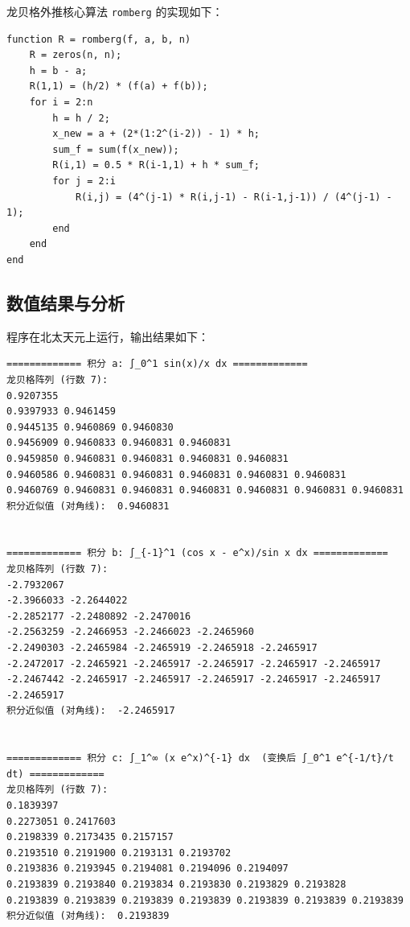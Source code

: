\documentclass[12pt,a4paper]{article}
\begin{document}
龙贝格外推核心算法 \texttt{romberg} 的实现如下：

\begin{lstlisting}[caption={龙贝格函数}, label={lst:romberg}]
function R = romberg(f, a, b, n)
    R = zeros(n, n);
    h = b - a;
    R(1,1) = (h/2) * (f(a) + f(b));
    for i = 2:n
        h = h / 2;
        x_new = a + (2*(1:2^(i-2)) - 1) * h;
        sum_f = sum(f(x_new));
        R(i,1) = 0.5 * R(i-1,1) + h * sum_f;
        for j = 2:i
            R(i,j) = (4^(j-1) * R(i,j-1) - R(i-1,j-1)) / (4^(j-1) - 1);
        end
    end
end
\end{lstlisting}

\subsection{数值结果与分析}

程序在北太天元上运行，输出结果如下：

\begin{verbatim}
============= 积分 a: ∫_0^1 sin(x)/x dx =============
龙贝格阵列 (行数 7):
0.9207355 
0.9397933 0.9461459 
0.9445135 0.9460869 0.9460830 
0.9456909 0.9460833 0.9460831 0.9460831 
0.9459850 0.9460831 0.9460831 0.9460831 0.9460831 
0.9460586 0.9460831 0.9460831 0.9460831 0.9460831 0.9460831 
0.9460769 0.9460831 0.9460831 0.9460831 0.9460831 0.9460831 0.9460831 
积分近似值 (对角线):  0.9460831


============= 积分 b: ∫_{-1}^1 (cos x - e^x)/sin x dx =============
龙贝格阵列 (行数 7):
-2.7932067 
-2.3966033 -2.2644022 
-2.2852177 -2.2480892 -2.2470016 
-2.2563259 -2.2466953 -2.2466023 -2.2465960 
-2.2490303 -2.2465984 -2.2465919 -2.2465918 -2.2465917 
-2.2472017 -2.2465921 -2.2465917 -2.2465917 -2.2465917 -2.2465917 
-2.2467442 -2.2465917 -2.2465917 -2.2465917 -2.2465917 -2.2465917 -2.2465917 
积分近似值 (对角线):  -2.2465917


============= 积分 c: ∫_1^∞ (x e^x)^{-1} dx  (变换后 ∫_0^1 e^{-1/t}/t dt) =============
龙贝格阵列 (行数 7):
0.1839397 
0.2273051 0.2417603 
0.2198339 0.2173435 0.2157157 
0.2193510 0.2191900 0.2193131 0.2193702 
0.2193836 0.2193945 0.2194081 0.2194096 0.2194097 
0.2193839 0.2193840 0.2193834 0.2193830 0.2193829 0.2193828 
0.2193839 0.2193839 0.2193839 0.2193839 0.2193839 0.2193839 0.2193839 
积分近似值 (对角线):  0.2193839
\end{verbatim}
\end{document}
